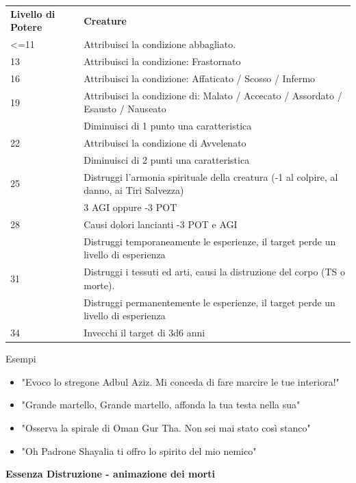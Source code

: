 \documentclass[a4paper,11pt,twoside,openany]{book}
\begin{document}
\bigskip

\begin{tabularx}{0.95\textwidth}{lX}
	\toprule
	\textbf{Livello di Potere} & \textbf{Creature}\\
	<=11  & Attribuisci la condizione abbagliato.  \\
	13    & Attribuisci la condizione: Frastornato    \\
	16    & Attribuisci la condizione: Affaticato / Scosso / Infermo  \\
	19    & Attribuisci la condizione di: Malato / Accecato / Assordato / Esausto / Nauseato\\
	      & Diminuisci di 1 punto una caratteristica   \\
	22    & Attribuisci la condizione di Avvelenato    \\
	      & Diminuisci di 2 punti una caratteristica   \\
	25    & Distruggi l’armonia spirituale della creatura (-1 al colpire, al danno, ai Tiri Salvezza)\\
	      & 3 AGI oppure -3 POT  \\
	28    & Causi dolori lancianti -3 POT e AGI  \\
	      & Distruggi temporaneamente le esperienze, il target perde un livello di esperienza \\
	31    & Distruggi i tessuti ed arti, causi la distruzione del corpo (TS o morte). \\
	      & Distruggi permanentemente le esperienze, il target perde un livello di esperienza \\
	34    & Invecchi il target di 3d6 anni \\
\end{tabularx}

\bigskip

Esempi
\begin{itemize}
	\item
	      "Evoco lo stregone Adbul Aziz. Mi conceda di fare marcire le tue interiora!"
	\item
	      "Grande martello, Grande martello, affonda la tua testa nella sua"
	\item
	      "Osserva la spirale di Oman Gur Tha. Non sei mai stato così stanco"
	\item
	      "Oh Padrone Shayalia ti offro lo spirito del mio nemico"
\end{itemize}

\bigskip

\textbf{Essenza Distruzione - animazione dei morti}
\end{document}
